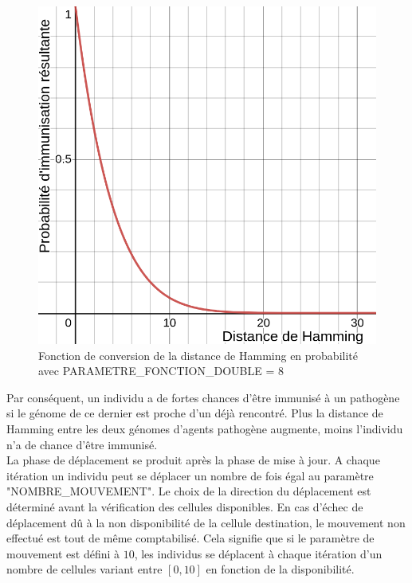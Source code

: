 \begin{figure}[h]
\begin{minipage}[b]{0.4\textwidth}
    \includegraphics[width=\textwidth]{Images/doubleHamming8.png}
    \caption[Fonction (double) de converstion en probabilité (facteur 8)]{Fonction de conversion de la distance de Hamming en probabilité avec {\tiny PARAMETRE\_FONCTION\_DOUBLE} = $8$}
  \end{minipage}
\end{figure}

Par conséquent, un individu a de fortes chances d'être immunisé à un pathogène si le génome de ce dernier est proche d'un déjà rencontré. Plus la distance de Hamming entre les deux génomes d'agents pathogène augmente, moins l'individu n'a de chance d'être immunisé.\\

La phase de déplacement se produit après la phase de mise à jour. A chaque itération un individu peut se déplacer un nombre de fois égal au paramètre {\small "NOMBRE\_MOUVEMENT"}. Le choix de la direction du déplacement est déterminé avant la vérification des cellules disponibles. En cas d'échec de déplacement dû à la non disponibilité de la cellule destination, le mouvement non effectué est tout de même comptabilisé. Cela signifie que si le paramètre de mouvement est défini à $10$, les individus se déplacent à chaque itération d'un nombre de cellules variant entre $[0,10]$ en fonction de la disponibilité.\\

